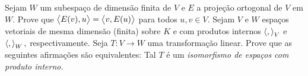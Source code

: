 \documentclass[11pt,a4paper]{article}
\begin{document}
  Sejam $W$ um subespaço de dimensão finita de $V$ e $E$ a projeção ortogonal de $V$ em $W$. Prove que $\left\langle E(v), u \right\rangle = \left\langle v, E(u) \right\rangle$ para todos $u, v \in V.$
 Sejam $V$ e $W$ espaços vetoriais de mesma dimensão (finita) sobre $K$ e com produtos internos $\left\langle , \right\rangle_V$ e $\left\langle , \right\rangle_W,$ respectivamente. Seja $T : V \rightarrow W$ uma transformação linear. Prove que as
seguintes afirmações são equivalentes:
Tal $T$ é um \emph{isomorfismo de espaços com produto interno.}
\end{document}

